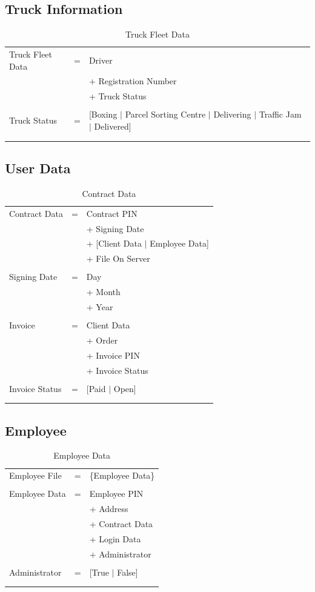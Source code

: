\documentclass[11pt,a4paper,oneside,svgnames]{report}
\begin{document}
\subsection{Truck Information}

\begin{longtable}{p{3.5cm}p{0.5cm}p{8.5cm}}
Truck Fleet Data & = & Driver\\
&  & + Registration Number\\
&  & + Truck Status \\
\\
Truck Status & = & [Boxing $|$ Parcel Sorting Centre $|$ Delivering $|$ Traffic Jam $|$ Delivered] \\
\hfill\\
\caption{Truck Fleet Data}\\
\end{longtable}

\subsection{User Data}
\begin{longtable}{p{3.5cm}p{0.5cm}p{8.5cm}}
Contract Data & = & Contract PIN\\
& & + Signing Date\\
& & + [Client Data $|$ Employee Data]\\
& & + File On Server\\
\\
Signing Date & = & Day\\
&  & + Month\\
&  & + Year\\
\\
Invoice & = & Client Data\\
&  & + Order\\
&  & + Invoice PIN\\
&  & + Invoice Status\\
\\
Invoice Status & = & [Paid $|$ Open]\\
\hfill\\
\caption{Contract Data}\\
\end{longtable}

\subsection{Employee}

\begin{longtable}{p{3.5cm}p{0.5cm}p{8.5cm}}
Employee File & = & \{Employee Data\}\\
\\
Employee Data & = & Employee PIN\\
&  & + Address\\
&  & + Contract Data\\
&  & + Login Data\\
&  & + Administrator\\
\\
Administrator & = & [True $|$ False]\\
\hfill\\
\caption{Employee Data}\\
\end{longtable}
\end{document}
